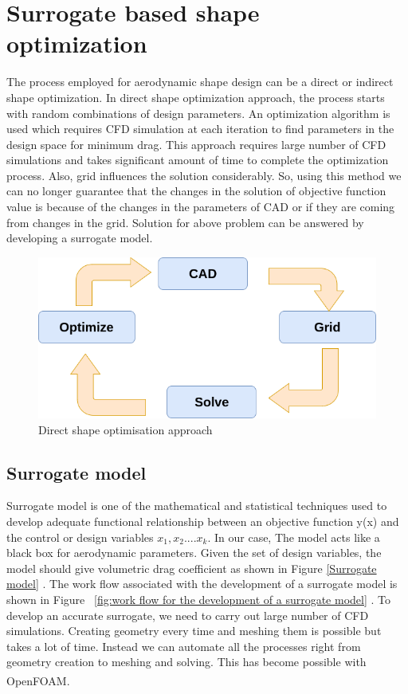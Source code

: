 \chapter{Surrogate based shape optimization}
\label{optimization}
The process employed for aerodynamic shape design can be a direct or indirect shape optimization. In direct shape optimization approach, the process starts with random combinations of design parameters. An optimization algorithm is used which requires CFD simulation at each iteration to find parameters in the design space for minimum drag. This approach requires large number of CFD simulations and takes significant amount of time to complete the optimization process. Also, grid influences the solution considerably. So, using this method we can no longer guarantee that the changes in the solution of objective function value is because of the changes in the parameters of CAD or if they are coming from changes in the grid. Solution for above problem can be answered by developing a surrogate model.
\begin{figure}[H]
	\includegraphics[width=\textwidth]{optimization/closed_loop.png}
	\caption{Direct shape optimisation approach}
	\label{Closed Optimization loop} %
\end{figure}

\section{Surrogate model}

 Surrogate model is one of the mathematical and statistical techniques used to develop adequate functional relationship between an objective function y(x) and the control or design variables $ x_1 , x_2 .... x_k $. In our case, The model acts like a black box for aerodynamic parameters. Given the set of design variables, the model should give volumetric drag coefficient as shown in Figure \ref{Surrogate model} . The work flow associated with the development of a surrogate model is shown in Figure ~\ref{fig:work flow for the development of a surrogate model} . To develop an accurate surrogate, we need to carry out large number of CFD simulations. Creating geometry every time and meshing them is possible but takes a lot of time. Instead we can automate all the processes right from geometry creation to meshing and solving. This has become possible with OpenFOAM\textsuperscript{\textregistered}.

